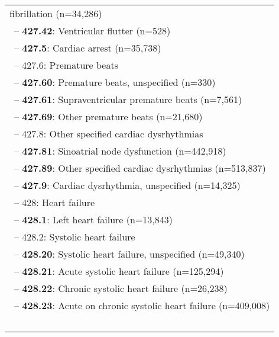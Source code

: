 \begin{longtable}{p{\textwidth}}
fibrillation (n=34,286)} \\ \-\ \hspace{40pt}\footnotesize{-- {\color{ForestGreen} \textbf{427.42}}: Ventricular flutter (n=528)} \\ \-\ \hspace{30pt}\footnotesize{-- {\color{ForestGreen} \textbf{427.5}}: Cardiac arrest (n=35,738)} \\ \-\ \hspace{30pt}\footnotesize{-- 427.6: Premature beats} \\ \-\ \hspace{40pt}\footnotesize{-- {\color{ForestGreen} \textbf{427.60}}: Premature beats, unspecified (n=330)} \\ \-\ \hspace{40pt}\footnotesize{-- {\color{ForestGreen} \textbf{427.61}}: Supraventricular premature beats (n=7,561)} \\ \-\ \hspace{40pt}\footnotesize{-- {\color{ForestGreen} \textbf{427.69}}: Other premature beats (n=21,680)} \\ \-\ \hspace{30pt}\footnotesize{-- 427.8: Other specified cardiac dysrhythmias} \\ \-\ \hspace{40pt}\footnotesize{-- {\color{ForestGreen} \textbf{427.81}}: Sinoatrial node dysfunction (n=442,918)} \\ \-\ \hspace{40pt}\footnotesize{-- {\color{ForestGreen} \textbf{427.89}}: Other specified cardiac dysrhythmias (n=513,837)} \\ \-\ \hspace{30pt}\footnotesize{-- {\color{ForestGreen} \textbf{427.9}}: Cardiac dysrhythmia, unspecified (n=14,325)} \\ \-\ \hspace{20pt}\footnotesize{-- 428: Heart failure} \\ \-\ \hspace{30pt}\footnotesize{-- {\color{ForestGreen} \textbf{428.1}}: Left heart failure (n=13,843)} \\ \-\ \hspace{30pt}\footnotesize{-- 428.2: Systolic heart failure} \\ \-\ \hspace{40pt}\footnotesize{-- {\color{ForestGreen} \textbf{428.20}}: Systolic heart failure, unspecified (n=49,340)} \\ \-\ \hspace{40pt}\footnotesize{-- {\color{ForestGreen} \textbf{428.21}}: Acute systolic heart failure (n=125,294)} \\ \-\ \hspace{40pt}\footnotesize{-- {\color{ForestGreen} \textbf{428.22}}: Chronic systolic heart failure (n=26,238)} \\ \-\ \hspace{40pt}\footnotesize{-- {\color{ForestGreen} \textbf{428.23}}: Acute on chronic systolic heart failure (n=409,008)} \\ \-\ 
\end{longtable}
